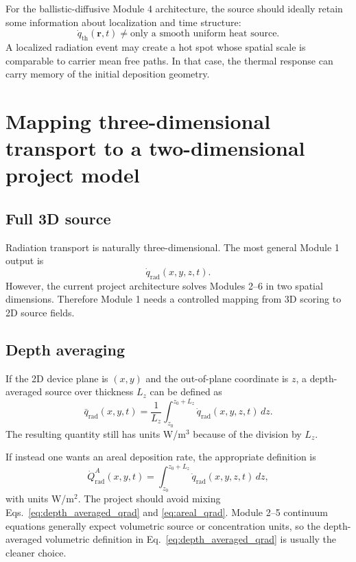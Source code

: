 \documentclass[11pt]{article}
\newcommand{\qrad}{\dot{q}_{\mathrm{rad}}}
\newcommand{\qth}{\dot{q}_{\mathrm{th}}}
\newcommand{\rpos}{\mathbf{r}}
\begin{document}
For the ballistic-diffusive Module 4 architecture, the source should ideally retain some information about localization and time structure:
\begin{equation}
\qth(\rpos,t)
\neq
\text{only a smooth uniform heat source}.
\end{equation}
A localized radiation event may create a hot spot whose spatial scale is comparable to carrier mean free paths. In that case, the thermal response can carry memory of the initial deposition geometry.

\section{Mapping three-dimensional transport to a two-dimensional project model}

\subsection{Full 3D source}

Radiation transport is naturally three-dimensional. The most general Module 1 output is
\begin{equation}
\qrad(x,y,z,t).
\end{equation}
However, the current project architecture solves Modules 2--6 in two spatial dimensions. Therefore Module 1 needs a controlled mapping from 3D scoring to 2D source fields.

\subsection{Depth averaging}

If the 2D device plane is $(x,y)$ and the out-of-plane coordinate is $z$, a depth-averaged source over thickness $L_z$ can be defined as
\begin{equation}
\bar{q}_{\mathrm{rad}}(x,y,t)
=
\frac{1}{L_z}
\int_{z_0}^{z_0+L_z}
\qrad(x,y,z,t)\,dz.
\label{eq:depth_averaged_qrad}
\end{equation}
The resulting quantity still has units W/m$^3$ because of the division by $L_z$.

If instead one wants an areal deposition rate, the appropriate definition is
\begin{equation}
\dot{Q}_{\mathrm{rad}}^{A}(x,y,t)
=
\int_{z_0}^{z_0+L_z}
\qrad(x,y,z,t)\,dz,
\label{eq:areal_qrad}
\end{equation}
with units W/m$^2$. The project should avoid mixing Eqs.~\eqref{eq:depth_averaged_qrad} and \eqref{eq:areal_qrad}. Module 2--5 continuum equations generally expect volumetric source or concentration units, so the depth-averaged volumetric definition in Eq.~\eqref{eq:depth_averaged_qrad} is usually the cleaner choice.
\end{document}
